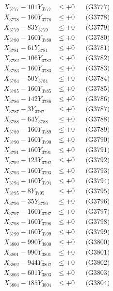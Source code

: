 \documentclass[a4paper,10pt]{article}
\begin{document}
{\begin{align}
X_{3777} - 101Y_{3777} &\leq +0 && \text{(G3777)} \\
X_{3778} - 160Y_{3778} &\leq +0 && \text{(G3778)} \\
X_{3779} - 83Y_{3779} &\leq +0 && \text{(G3779)} \\
X_{3780} - 160Y_{3780} &\leq +0 && \text{(G3780)} \\
\allowbreak
X_{3781} - 61Y_{3781} &\leq +0 && \text{(G3781)} \\
X_{3782} - 106Y_{3782} &\leq +0 && \text{(G3782)} \\
X_{3783} - 160Y_{3783} &\leq +0 && \text{(G3783)} \\
X_{3784} - 50Y_{3784} &\leq +0 && \text{(G3784)} \\
X_{3785} - 160Y_{3785} &\leq +0 && \text{(G3785)} \\
X_{3786} - 142Y_{3786} &\leq +0 && \text{(G3786)} \\
X_{3787} - 3Y_{3787} &\leq +0 && \text{(G3787)} \\
X_{3788} - 64Y_{3788} &\leq +0 && \text{(G3788)} \\
X_{3789} - 160Y_{3789} &\leq +0 && \text{(G3789)} \\
X_{3790} - 160Y_{3790} &\leq +0 && \text{(G3790)} \\
\allowbreak
X_{3791} - 160Y_{3791} &\leq +0 && \text{(G3791)} \\
X_{3792} - 123Y_{3792} &\leq +0 && \text{(G3792)} \\
X_{3793} - 160Y_{3793} &\leq +0 && \text{(G3793)} \\
X_{3794} - 160Y_{3794} &\leq +0 && \text{(G3794)} \\
X_{3795} - 8Y_{3795} &\leq +0 && \text{(G3795)} \\
X_{3796} - 35Y_{3796} &\leq +0 && \text{(G3796)} \\
X_{3797} - 160Y_{3797} &\leq +0 && \text{(G3797)} \\
X_{3798} - 160Y_{3798} &\leq +0 && \text{(G3798)} \\
X_{3799} - 160Y_{3799} &\leq +0 && \text{(G3799)} \\
X_{3800} - 990Y_{3800} &\leq +0 && \text{(G3800)} \\
\allowbreak
X_{3801} - 990Y_{3801} &\leq +0 && \text{(G3801)} \\
X_{3802} - 944Y_{3802} &\leq +0 && \text{(G3802)} \\
X_{3803} - 601Y_{3803} &\leq +0 && \text{(G3803)} \\
X_{3804} - 185Y_{3804} &\leq +0 && \text{(G3804)} \\

\end{align}}
\end{document}
